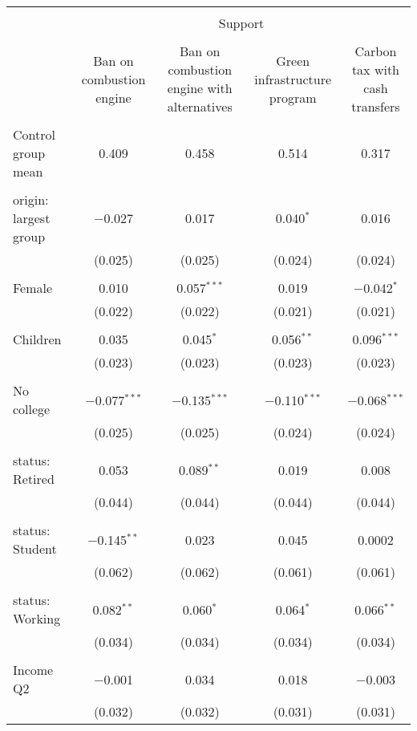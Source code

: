 
\begin{tabular}{@{\extracolsep{5pt}}lcccc} 
\\[-1.8ex]\hline 
\hline \\[-1.8ex] 
 & \multicolumn{4}{c}{Support} \\ 
\cline{2-5} 
\\[-1.8ex] & Ban on combustion engine & Ban on combustion engine with alternatives & Green infrastructure program & Carbon tax with cash transfers \\ 
\hline \\[-1.8ex] 
 Control group mean & 0.409 & 0.458 & 0.514 & 0.317  \\ \hline \\[-1.8ex] origin: largest group & $-$0.027 & 0.017 & 0.040$^{*}$ & 0.016 \\ 
  & (0.025) & (0.025) & (0.024) & (0.024) \\ 
  & & & & \\ 
 Female & 0.010 & 0.057$^{***}$ & 0.019 & $-$0.042$^{*}$ \\ 
  & (0.022) & (0.022) & (0.021) & (0.021) \\ 
  & & & & \\ 
 Children & 0.035 & 0.045$^{*}$ & 0.056$^{**}$ & 0.096$^{***}$ \\ 
  & (0.023) & (0.023) & (0.023) & (0.023) \\ 
  & & & & \\ 
 No college & $-$0.077$^{***}$ & $-$0.135$^{***}$ & $-$0.110$^{***}$ & $-$0.068$^{***}$ \\ 
  & (0.025) & (0.025) & (0.024) & (0.024) \\ 
  & & & & \\ 
 status: Retired & 0.053 & 0.089$^{**}$ & 0.019 & 0.008 \\ 
  & (0.044) & (0.044) & (0.044) & (0.044) \\ 
  & & & & \\ 
 status: Student & $-$0.145$^{**}$ & 0.023 & 0.045 & 0.0002 \\ 
  & (0.062) & (0.062) & (0.061) & (0.061) \\ 
  & & & & \\ 
 status: Working & 0.082$^{**}$ & 0.060$^{*}$ & 0.064$^{*}$ & 0.066$^{**}$ \\ 
  & (0.034) & (0.034) & (0.034) & (0.034) \\ 
  & & & & \\ 
 Income Q2 & $-$0.001 & 0.034 & 0.018 & $-$0.003 \\ 
  & (0.032) & (0.032) & (0.031) & (0.031) \\ 

\end{tabular}
